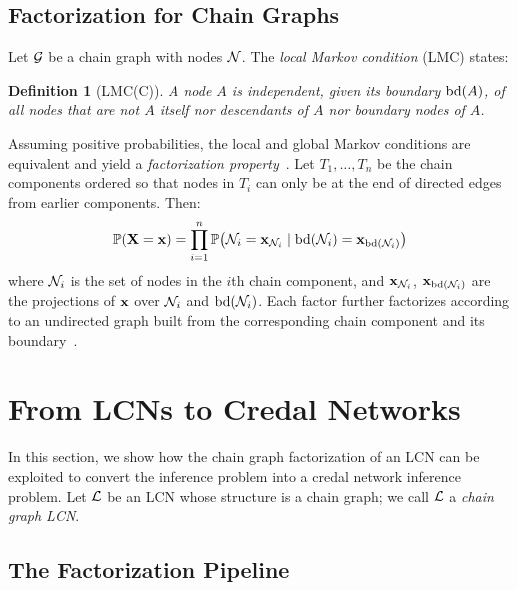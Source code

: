 \documentclass{article}
\newtheorem{definition}{Definition}
\newcommand{\pr}[1]{\mathbb{P}\!\left( #1 \right)}
\begin{document}
\subsection{Factorization for Chain Graphs}
\label{sec-factorization}

Let $\mathcal{G}$ be a chain graph with nodes $\mathcal{N}$. The \emph{local Markov condition} (LMC) states:

\begin{definition}[LMC(C)]
    A node $A$ is independent, given its boundary $\mathrm{bd}(A)$, of all nodes that are not $A$ itself nor descendants of $A$ nor boundary nodes of $A$.
\end{definition}

Assuming positive probabilities, the local and global Markov conditions are equivalent and yield a \emph{factorization property}~\cite{cowell99}. Let $T_1, \dots, T_n$ be the chain components ordered so that nodes in $T_i$ can only be at the end of directed edges from earlier components. Then:
\begin{equation}\label{eq:factorization}
\pr{\bX=\bx} = \prod_{i=1}^n \pr{\cN_i=\bx_{\cN_i}\mid\bd(\cN_i)=\bx_{\bd(\cN_i)}}
\end{equation}
where $\mathcal{N}_i$ is the set of nodes in the $i$th chain component, and $\mathbf{x}_{\mathcal{N}_i}$, $\mathbf{x}_{\mathrm{bd}(\mathcal{N}_i)}$ are the projections of $\mathbf{x}$ over $\mathcal{N}_i$ and $\mathrm{bd}(\mathcal{N}_i)$. Each factor further factorizes according to an undirected graph built from the corresponding chain component and its boundary~\cite{cowell99}.


\section{From LCNs to Credal Networks}
\label{sec-lcn-to-credal}

In this section, we show how the chain graph factorization of an LCN can be exploited to convert the inference problem into a credal network inference problem. Let $\mathcal{L}$ be an LCN whose structure is a chain graph; we call $\mathcal{L}$ a \emph{chain graph LCN}.

\subsection{The Factorization Pipeline}
\end{document}
